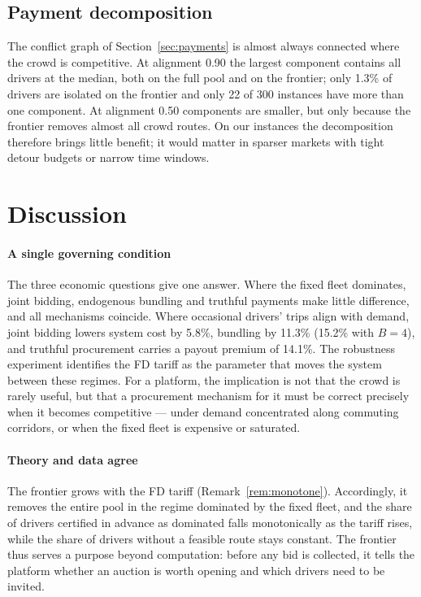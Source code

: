 \documentclass[review,12pt]{elsarticle}
\theoremstyle{definition}
\theoremstyle{remark}
\begin{document}
\subsection{Payment decomposition}

The conflict graph of Section~\ref{sec:payments} is almost always connected
where the crowd is competitive. At alignment 0.90 the largest component
contains all drivers at the median, both on the full pool and on the
frontier; only 1.3\% of drivers are isolated on the frontier and only 22 of
300 instances have more than one component. At alignment 0.50 components are
smaller, but only because the frontier removes almost all crowd routes. On
our instances the decomposition therefore brings little benefit; it would
matter in sparser markets with tight detour budgets or narrow time windows.

\section{Discussion}
\label{sec:discussion}

\paragraph{A single governing condition} The three economic questions give
one answer. Where the fixed fleet dominates, joint bidding, endogenous
bundling and truthful payments make little difference, and all mechanisms
coincide. Where occasional drivers' trips align with demand, joint bidding
lowers system cost by 5.8\%, bundling by 11.3\% (15.2\% with $B=4$), and
truthful procurement carries a payout premium of 14.1\%. The robustness
experiment identifies the FD tariff as the parameter that moves the system
between these regimes. For a platform, the implication is not that the crowd
is rarely useful, but that a procurement mechanism for it must be correct
precisely when it becomes competitive --- under demand concentrated along
commuting corridors, or when the fixed fleet is expensive or saturated.

\paragraph{Theory and data agree} The frontier grows with the FD tariff
(Remark~\ref{rem:monotone}). Accordingly, it removes the entire pool in the
regime dominated by the fixed fleet, and the share of drivers certified in
advance as dominated falls monotonically as the tariff rises, while the
share of drivers without a feasible route stays constant. The frontier thus
serves a purpose beyond computation: before any bid is collected, it tells
the platform whether an auction is worth opening and which drivers need to
be invited.
\end{document}
